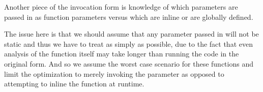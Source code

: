 Another piece of the invocation form is knowledge of which parameters are passed in as function parameters versus which are inline or are globally defined.

The issue here is that we should assume that any parameter passed in will not be static and thus we have to treat as simply as possible, due to the fact that even analysis of the function itself may take longer than running the code in the original form.  And so we assume the worst case scenario for these functions and limit the optimization to merely invoking the parameter as opposed to attempting to inline the function at runtime.